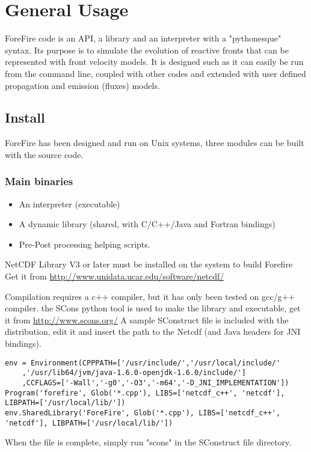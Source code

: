 \part{General Usage}

ForeFire code is an API, a library and an interpreter with a "pythonesque" syntax.
Its purpose is to simulate the evolution of reactive fronts that can be represented with front velocity models.
It is designed such as it can easily be run from the command line, coupled with other codes and extended with user defined propagation and emission (fluxes) models. 

\chapter{Install}

ForeFire has been designed and run on Unix systems, three modules can be built with the source code.

\section{Main binaries}
\begin{itemize}
\item An interpreter (executable)
\item A dynamic library (shared, with C/C++/Java and Fortran bindings)
\item Pre-Post processing helping scripts.
\end{itemize}

NetCDF  Library V3 or later must be installed on the system to build Forefire
Get it from \url{http://www.unidata.ucar.edu/software/netcdf/}

Compilation requires a c++ compiler, but it has only been tested on gcc/g++ compiler.
the SCons python tool is used to make the library and executable, get it from  \url{http://www.scons.org/}
A sample SConstruct file is included with the distribution, edit it and insert the path to the Netcdf (and Java headers for JNI bindings).

\begin{tiny}
\begin{verbatim}
env = Environment(CPPPATH=['/usr/include/','/usr/local/include/'
	,'/usr/lib64/jvm/java-1.6.0-openjdk-1.6.0/include/']
	,CCFLAGS=['-Wall','-g0','-O3','-m64','-D_JNI_IMPLEMENTATION'])
Program('forefire', Glob('*.cpp'), LIBS=['netcdf_c++', 'netcdf'], LIBPATH=['/usr/local/lib/'])
env.SharedLibrary('ForeFire', Glob('*.cpp'), LIBS=['netcdf_c++', 'netcdf'], LIBPATH=['/usr/local/lib/'])
\end{verbatim}

\end{tiny}
When the file is complete, simply run "scons" in the SConstruct file directory.

